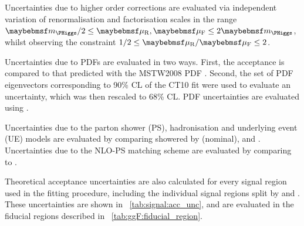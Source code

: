 Uncertainties due to higher order corrections are evaluated via independent variation of 
renormalisation and factorisation scales in the range $\mH/2 \leq \mur,\muf \leq 2\mH$, 
whilst observing the constraint $1/2 \leq \mur/\muf \leq 2$. 

Uncertainties due to PDFs are evaluated in two ways. First, the acceptance is compared to 
that predicted with the MSTW2008 PDF \cite{MSTW}. Second, the set of PDF eigenvectors 
corresponding to 90\% CL of the CT10 fit were used to evaluate an uncertainty, 
which was then rescaled to 68\% CL. PDF uncertainties are evaluated using \mcatnlo.

Uncertainties due to the parton shower (PS), hadronisation and underlying event (UE) 
models are evaluated by comparing \powhegbox showered by  (nominal),  
and \fherwig. Uncertainties due to the NLO-PS matching scheme are evaluated by comparing 
\meps{\powhegbox}{\fherwig} to \meps{\mcatnlo}{\herwigpp}.

Theoretical acceptance uncertainties are also calculated for every signal region used in 
the fitting procedure, including the individual signal regions split by \ptsubleadlep and 
\mll. These uncertainties are shown in \Table~\ref{tab:signal:acc_unc}, and are evaluated 
in the fiducial regions described in \Table~\ref{tab:ggF:fiducial_region}.

